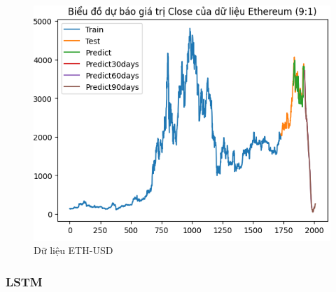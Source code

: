 \documentclass[conference]{IEEEtran}
\begin{document}
\begin{figure}[H]
\begin{minipage}{0.15\textwidth}
    \includegraphics[width=1\textwidth]{Figure/ETH91.png}
    \end{minipage}
    \caption{Dữ liệu ETH-USD}
    \label{fig:1}
\end{figure}

\subsubsection{LSTM}
\end{document}
